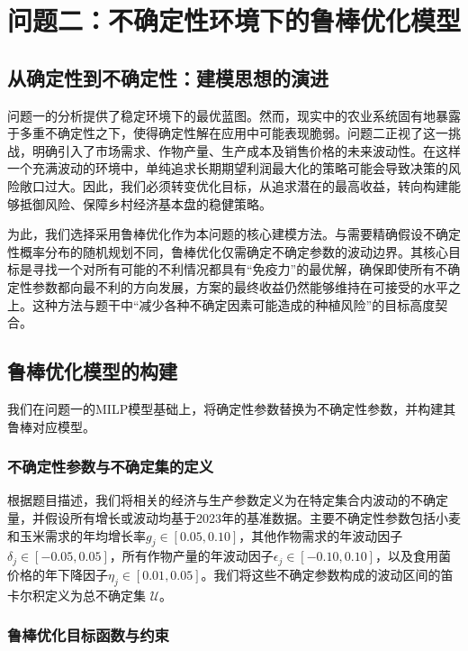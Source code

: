 \documentclass[withoutpreface,bwprint]{cumcmthesis} %
\begin{document}




\section{问题二：不确定性环境下的鲁棒优化模型}

\subsection{从确定性到不确定性：建模思想的演进}

问题一的分析提供了稳定环境下的最优蓝图。然而，现实中的农业系统固有地暴露于多重不确定性之下，使得确定性解在应用中可能表现脆弱。问题二正视了这一挑战，明确引入了市场需求、作物产量、生产成本及销售价格的未来波动性。在这样一个充满波动的环境中，单纯追求长期期望利润最大化的策略可能会导致决策的风险敞口过大。因此，我们必须转变优化目标，从追求潜在的最高收益，转向构建能够抵御风险、保障乡村经济基本盘的稳健策略。

为此，我们选择采用鲁棒优化作为本问题的核心建模方法。与需要精确假设不确定性概率分布的随机规划不同，鲁棒优化仅需确定不确定参数的波动边界。其核心目标是寻找一个对所有可能的不利情况都具有“免疫力”的最优解，确保即使所有不确定性参数都向最不利的方向发展，方案的最终收益仍然能够维持在可接受的水平之上。这种方法与题干中“减少各种不确定因素可能造成的种植风险”的目标高度契合。

\subsection{鲁棒优化模型的构建}

我们在问题一的MILP模型基础上，将确定性参数替换为不确定性参数，并构建其鲁棒对应模型。

\subsubsection{不确定性参数与不确定集的定义}

根据题目描述，我们将相关的经济与生产参数定义为在特定集合内波动的不确定量，并假设所有增长或波动均基于2023年的基准数据。主要不确定性参数包括小麦和玉米需求的年均增长率$g_j \in [0.05, 0.10]$，其他作物需求的年波动因子$\delta_j \in [-0.05, 0.05]$，所有作物产量的年波动因子$\epsilon_j \in [-0.10, 0.10]$，以及食用菌价格的年下降因子$\eta_j \in [0.01, 0.05]$。我们将这些不确定参数构成的波动区间的笛卡尔积定义为总不确定集 $\mathcal{U}$。

\subsubsection{鲁棒优化目标函数与约束}
\end{document}
